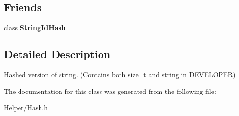\subsection*{Friends}
\begin{DoxyCompactItemize}
\item 
\mbox{\label{classStringId_acaaecd84cdca8656f27be4e252a0bc1b}} 
class {\bfseries String\+Id\+Hash}
\end{DoxyCompactItemize}


\subsection{Detailed Description}
Hashed version of string. (Contains both size\+\_\+t and string in D\+E\+V\+E\+L\+O\+P\+ER) 

The documentation for this class was generated from the following file\+:\begin{DoxyCompactItemize}
\item 
Helper/\hyperlink{Hash_8h}{Hash.\+h}\end{DoxyCompactItemize}
